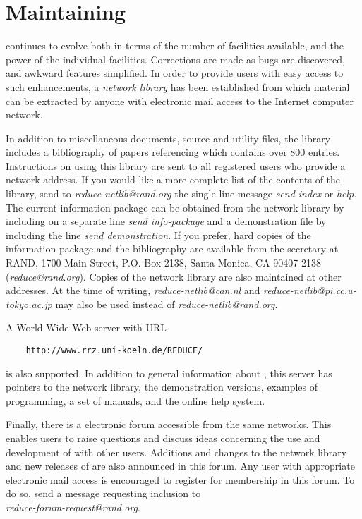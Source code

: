 \chapter {Maintaining {\REDUCE}}

{\REDUCE} continues to evolve both in terms of the number of facilities
available, and the power of the individual facilities.  Corrections are
made as bugs are discovered, and awkward features simplified.  In order to
provide users with easy access to such enhancements, a {\em {\REDUCE}
network library\/} has been established from which material can be extracted
by anyone with electronic mail access to the Internet computer network.

In addition to miscellaneous documents, source and utility files, the
library includes a bibliography of papers referencing {\REDUCE} which
contains over 800 entries.  Instructions on using this library are sent to
all registered {\REDUCE} users who provide a network address.  If you
would like a more complete list of the contents of the library, send to
{\em reduce-netlib@rand.org\/} the single line message {\em send index\/} or
{\em help}. The current {\REDUCE} information
package can be obtained from the network library by including on a
separate line {\em send info-package\/} and a demonstration file by
including the line {\em send demonstration}.  If you prefer, hard copies
of the information package and the bibliography are available from the
{\REDUCE} secretary at RAND, 1700 Main Street, P.O. Box 2138, Santa
Monica, CA 90407-2138 ({\em reduce@rand.org}).  Copies of the network
library are also maintained at other addresses.  At the time of writing,
{\em reduce-netlib@can.nl\/} and {\em reduce-netlib@pi.cc.u-tokyo.ac.jp\/}
may also be used instead of {\em reduce-netlib@rand.org}.

A World Wide Web {\REDUCE} server with URL
\begin{verbatim}
	http://www.rrz.uni-koeln.de/REDUCE/
\end{verbatim}
is also supported.  In addition to general information about {\REDUCE}, this
server has pointers to the network library, the demonstration versions,
examples of {\REDUCE} programming, a set of manuals, and the {\REDUCE} online
help system.

Finally, there is a {\REDUCE} electronic forum accessible from the same
networks.  This enables {\REDUCE} users to raise questions and discuss
ideas concerning the use and development of {\REDUCE} with other users.
Additions and changes to the network library and new releases of {\REDUCE}
are also announced in this forum.  Any user with appropriate electronic
mail access is encouraged to register for membership in this forum.  To do
so, send a message requesting inclusion to \\
{\em reduce-forum-request@rand.org}.

